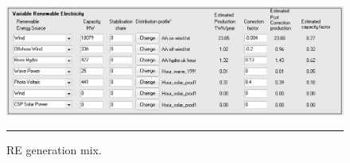 \begin{figure}[htbp]
	\centering
	\includegraphics[width=\textwidth]{figures/B02_VRE.png}
	\rule{\textwidth}{0.5pt} %
	\caption{RE generation mix.}
	\label{fig:B02-VRE}
\end{figure}